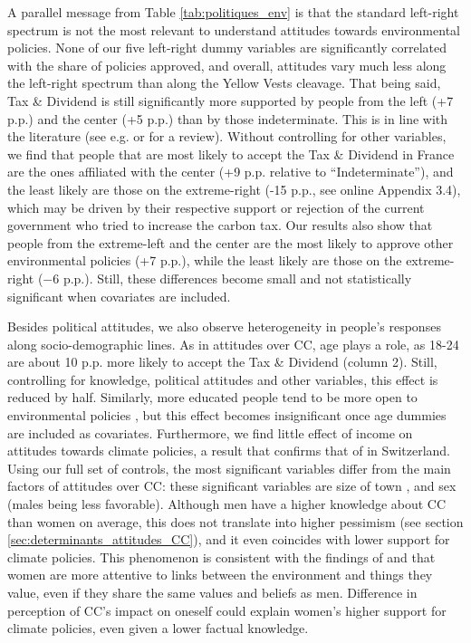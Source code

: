 \documentclass[english,5p,authoryear]{elsarticle}
\begin{document}
%
%
A parallel message from Table \ref{tab:politiques_env} is that the standard left-right spectrum is not the most relevant to understand attitudes towards environmental policies. None of our five left-right dummy variables are significantly correlated with the share of policies approved, and overall, attitudes vary much less along the left-right spectrum than along the Yellow Vests cleavage. That being said, Tax \& Dividend is still significantly more supported by people from the left (+7 p.p.) and the center (+5 p.p.) than by those indeterminate. This is in line with the literature (see e.g. \citealt{bornstein_lanz_2008,mccright_increasing_2013} or \citealt{drews_van_der_bergh_2016} for a review). Without controlling for other variables, we find that people that are most likely to accept the Tax \& Dividend in France are the ones affiliated with the center (+9 p.p. relative to ``Indeterminate''), and the least likely are those on the extreme-right (-15 p.p., see online Appendix 3.4), which may be driven by their respective support or rejection of the current government who tried to increase the carbon tax. Our results also show that people from the extreme-left and the center are the most likely to approve other environmental policies (+7 p.p.), while the least likely are those on the extreme-right ($-$6 p.p.). Still, these differences become small and not statistically significant when covariates are included. %
%

%
%

Besides political attitudes, we also observe heterogeneity in people's responses along socio-demographic lines. As in attitudes over CC, age plays a role, as 18-24 are about 10 p.p. more likely to accept the Tax \& Dividend (column 2). Still, controlling for knowledge, political attitudes and other variables, this effect is reduced by half. Similarly, more educated people tend to be more open to environmental policies \citep[as previously found by][]{thalmann_public_2004}, but this effect becomes insignificant once age dummies are included as covariates. Furthermore, we find little effect of income on attitudes towards climate policies, a result that confirms that of \citet{thalmann_public_2004} in Switzerland. Using our full set of controls, the most significant variables differ from the main factors of attitudes over CC: these significant variables are size of town \citep[city dwellers being more favorable to environmental policies, as in][]{thalmann_public_2004}, and sex (males being less favorable). Although men have a higher knowledge about CC than women on average, this does not translate into higher pessimism (see section \ref{sec:determinants_attitudes_CC}), and it even coincides with lower support for climate policies. This phenomenon is consistent with the findings of \citet{stern_value_1993} and \citet{hampel_gender_1996} that women are more attentive to links between the environment and things they value, even if they share the same values and beliefs as men. Difference in perception of CC's impact on oneself could explain women's higher support for climate policies, even given a lower factual knowledge. %
\end{document}
